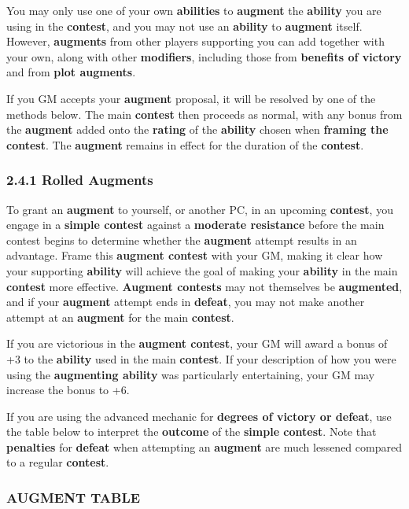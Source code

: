 \documentclass[
]{article}
\begin{document}
You may only use one of your own \textbf{abilities} to \textbf{augment}
the \textbf{ability} you are using in the \textbf{contest}, and you may
not use an \textbf{ability} to \textbf{augment} itself. However,
\textbf{augments} from other players supporting you can add together
with your own, along with other \textbf{modifiers}, including those from
\textbf{benefits of victory} and from \textbf{plot augments}.

If you GM accepts your \textbf{augment} proposal, it will be resolved by
one of the methods below. The main \textbf{contest} then proceeds as
normal, with any bonus from the \textbf{augment} added onto the
\textbf{rating} of the \textbf{ability} chosen when \textbf{framing the
contest}. The \textbf{augment} remains in effect for the duration of the
\textbf{contest}.

\hypertarget{rolled-augments}{%
\subsubsection{2.4.1 Rolled Augments}\label{rolled-augments}}

To grant an \textbf{augment} to yourself, or another PC, in an upcoming
\textbf{contest}, you engage in a \textbf{simple contest} against a
\textbf{moderate resistance} before the main contest begins to determine
whether the \textbf{augment} attempt results in an advantage. Frame this
\textbf{augment contest} with your GM, making it clear how your
supporting \textbf{ability} will achieve the goal of making your
\textbf{ability} in the main \textbf{contest} more effective.
\textbf{Augment contests} may not themselves be \textbf{augmented}, and
if your \textbf{augment} attempt ends in \textbf{defeat}, you may not
make another attempt at an \textbf{augment} for the main
\textbf{contest}.

If you are victorious in the \textbf{augment contest}, your GM will
award a bonus of +3 to the \textbf{ability} used in the main
\textbf{contest}. If your description of how you were using the
\textbf{augmenting ability} was particularly entertaining, your GM may
increase the bonus to +6.

If you are using the advanced mechanic for \textbf{degrees of victory or
defeat}, use the table below to interpret the \textbf{outcome} of the
\textbf{simple contest}. Note that \textbf{penalties} for
\textbf{defeat} when attempting an \textbf{augment} are much lessened
compared to a regular \textbf{contest}.

\hypertarget{augment-table}{%
\subsubsection{AUGMENT TABLE}\label{augment-table}}
\end{document}
